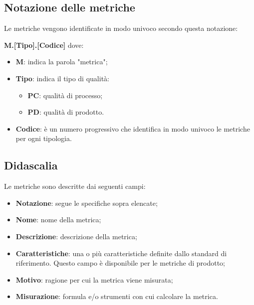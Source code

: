\subsection{Notazione delle metriche}
\par Le metriche vengono identificate in modo univoco secondo questa notazione: 
\par \textbf{M.[Tipo].[Codice]}
dove: 
\begin{itemize}
    \item \textbf{M}: indica la parola "metrica";
    \item \textbf{Tipo}: indica il tipo di qualità: 
        \begin{itemize}
            \item \textbf{PC}: qualità di processo; 
            \item \textbf{PD}: qualità di prodotto.
        \end{itemize}
    \item \textbf{Codice}: è un numero progressivo che identifica in modo univoco le metriche per ogni tipologia.
\end{itemize}

\subsection{Didascalia}
Le metriche sono descritte dai seguenti campi:
\begin{itemize}
    \item \textbf{Notazione}: segue le specifiche sopra elencate;
    \item \textbf{Nome}: nome della metrica;
    \item \textbf{Descrizione}: descrizione della metrica;
    \item \textbf{Caratteristiche}: una o più caratteristiche definite dallo standard di riferimento. Questo campo è disponibile per le metriche di prodotto;
    \item \textbf{Motivo}: ragione per cui la metrica viene misurata;
    \item \textbf{Misurazione}: formula e/o strumenti con cui calcolare la metrica.
\end{itemize}

